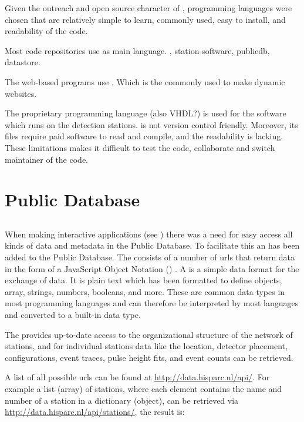 Given the outreach and open source character of \hisparc, programming languages were chosen that are relatively simple to learn, commonly used, easy to install, and readability of the code.

Most code repositories use \python as main language.
\sapphire, station-software, publicdb, datastore.

The web-based programs use \javascript. Which is the commonly used to make dynamic websites.

The proprietary programming language \labview (also VHDL?) is used for the  \daq software which runs on the detection stations. \labview is not version control friendly. Moreover, its files require paid software to read and compile, and the readability is lacking. These limitations makes it difficult to test the code, collaborate and switch maintainer of the code.




\section{\hisparc Public Database}

\subsection{\api}

When making interactive applications (see \jsparc) there was a need for easy access all kinds of data and metadata in the Public Database. To facilitate this an \api has been added to the Public Database. The \api consists of a number of urls that return data in the form of a JavaScript Object Notation (\json) \cite{rfc7159}. A \json is a simple data format for the exchange of data. It is plain text which has been formatted to define objects, array, strings, numbers, booleans, and more. These are common data types in most programming languages and can therefore be interpreted by most languages and converted to a built-in data type.

The \api provides up-to-date access to the organizational structure of the \hisparc network of stations, and for individual stations data like the \gps location, detector placement, configurations, event traces, pulse height fits, and event counts can be retrieved.

A list of all possible urls can be found at \url{http://data.hisparc.nl/api/}. For example a list (array) of \hisparc stations, where each element contains the name and number of a station in a dictionary (object), can be retrieved via \url{http://data.hisparc.nl/api/stations/}, the result is:

